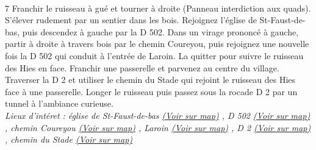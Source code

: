 \documentclass{article}
\begin{document}
        \paragraph{}
        7
                        Franchir le ruisseau à gué et tourner à droite (Panneau interdiction aux quads). S'élever rudement par un sentier dans les bois. Rejoignez l'église de St-Faust-de-bas, puis descendez à gauche par la D 502. Dans un virage prononcé à gauche, partir à droite à travers bois par le chemin Coureyou, puis rejoignez une nouvelle fois la D 502 qui conduit à l'entrée de Laroin. La quitter pour suivre le ruisseau des Hies en face. Franchir une passerelle et parvenez au centre du village. Traverser la D 2 et utiliser le chemin du Stade qui rejoint le ruisseau des Hies face à une passerelle. Longer le ruisseau puis passez sous la rocade D 2 par un tunnel à l'ambiance curieuse. 
                    \\
        \emph{Lieux d'intéret : église de
                            St-Faust-de-bas 
        \href{https://www.google.com/maps/?q=43.287530, -0.391115}{(Voir sur map)}
        , D 502 
        \href{https://www.google.com/maps/?q=43.287530, -0.391115}{(Voir sur map)}
        , chemin
                            Coureyou 
        \href{https://www.google.com/maps/?q=43.287530, -0.391115}{(Voir sur map)}
        , Laroin 
        \href{https://www.google.com/maps/?q=43.287530, -0.391115}{(Voir sur map)}
        , D 2 
        \href{https://www.google.com/maps/?q=43.287530, -0.391115}{(Voir sur map)}
        , chemin du
                            Stade 
        \href{https://www.google.com/maps/?q=43.287530, -0.391115}{(Voir sur map)}
        }\\~\\
\end{document}
